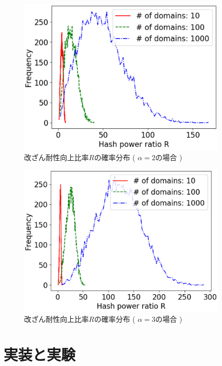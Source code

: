 \documentclass[a4paper,12pt]{jsarticle}
\begin{document}
%
\begin{figure}[th]%
  \begin{center}
    \includegraphics[width=100mm]{pht/hist-comp-R-alpha2.0-m1.0.eps}
  \end{center}
  \caption{改ざん耐性向上比率$R$の確率分布 ( $\alpha=2$の場合 ) }
  \label{fig:alpha2}
\end{figure}
%
%
\begin{figure}[H]%
  \begin{center}
    \includegraphics[width=100mm]{pht/hist-comp-R-alpha3.0-m1.0.eps}
  \end{center}
  \caption{改ざん耐性向上比率$R$の確率分布 ( $\alpha=3$の場合 ) }
  \label{fig:alpha3}
\end{figure}
%
\newpage
%

\section{実装と実験}
\end{document}
